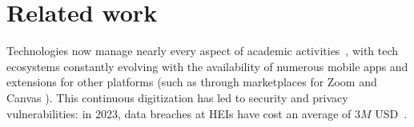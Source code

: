 
\section{Related work}

Technologies now manage nearly every aspect of academic activities~\cite{edtechPETS23, constant-expanding-classroom}, with tech ecosystems constantly evolving with the availability of numerous mobile apps and extensions for other platforms (such as through marketplaces for Zoom \cite{zoom} and Canvas \cite{Canvas}). %
This continuous digitization has led to security and privacy vulnerabilities: in 2023, data breaches at HEIs have cost an average of $3M$ USD~\cite{breach-stat}. 


